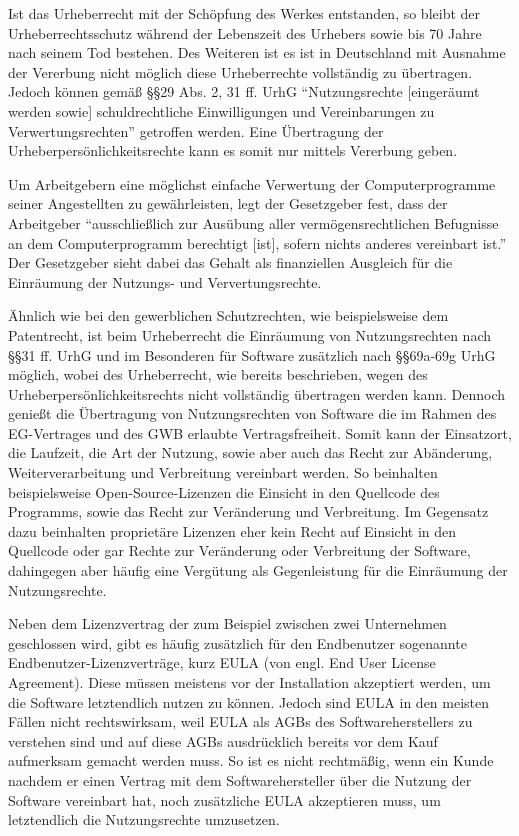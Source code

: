 Ist das Urheberrecht mit der Schöpfung des Werkes entstanden, so bleibt der Urheberrechtsschutz während der Lebenszeit des Urhebers sowie bis 70 Jahre nach seinem Tod bestehen.
Des Weiteren ist es ist in Deutschland mit Ausnahme der Vererbung nicht möglich diese Urheberrechte vollständig zu übertragen. Jedoch können gemäß §§29 Abs. 2, 31 ff. UrhG
“Nutzungsrechte [eingeräumt werden sowie] schuldrechtliche Einwilligungen und Vereinbarungen zu Verwertungsrechten” getroffen werden. Eine Übertragung der Urheberpersönlichkeitsrechte
kann es somit nur mittels Vererbung geben.

Um Arbeitgebern eine möglichst einfache Verwertung der Computerprogramme seiner Angestellten zu gewährleisten, legt der Gesetzgeber fest, dass der Arbeitgeber
“ausschließlich zur Ausübung aller vermögensrechtlichen Befugnisse an dem Computerprogramm berechtigt [ist], sofern nichts anderes vereinbart ist.” Der Gesetzgeber
sieht dabei das Gehalt als finanziellen Ausgleich für die Einräumung der Nutzungs- und Ververtungsrechte.

Ähnlich wie bei den gewerblichen Schutzrechten, wie beispielsweise dem Patentrecht, ist beim Urheberrecht die Einräumung von Nutzungsrechten nach §§31 ff. UrhG und im Besonderen
für Software zusätzlich nach §§69a-69g UrhG möglich, wobei des Urheberrecht, wie bereits beschrieben, wegen des Urheberpersönlichkeitsrechts nicht vollständig übertragen werden kann.
Dennoch genießt die Übertragung von Nutzungsrechten von Software die im Rahmen des EG-Vertrages und des GWB erlaubte Vertragsfreiheit. Somit kann der Einsatzort, die Laufzeit,
die Art der Nutzung, sowie aber auch das Recht zur Abänderung, Weiterverarbeitung und Verbreitung vereinbart werden. So beinhalten beispielsweise Open-Source-Lizenzen die
Einsicht in den Quellcode des Programms, sowie das Recht zur Veränderung und Verbreitung. Im Gegensatz dazu beinhalten proprietäre Lizenzen eher kein Recht auf Einsicht in den
Quellcode oder gar Rechte zur Veränderung oder Verbreitung der Software, dahingegen aber häufig eine Vergütung als Gegenleistung für die Einräumung der Nutzungsrechte.

Neben dem Lizenzvertrag der zum Beispiel zwischen zwei Unternehmen geschlossen wird, gibt es häufig zusätzlich für den Endbenutzer sogenannte Endbenutzer-Lizenzverträge,
kurz EULA (von engl. End User License Agreement). Diese müssen meistens vor der Installation akzeptiert werden, um die Software letztendlich nutzen zu können.
Jedoch sind EULA in den meisten Fällen nicht rechtswirksam, weil EULA als AGBs des Softwareherstellers zu verstehen sind und auf diese AGBs ausdrücklich bereits vor dem
Kauf aufmerksam gemacht werden muss. So ist es nicht rechtmäßig, wenn ein Kunde nachdem er einen Vertrag mit dem Softwarehersteller über die Nutzung der Software vereinbart hat,
noch zusätzliche EULA akzeptieren muss, um letztendlich die Nutzungsrechte umzusetzen.
